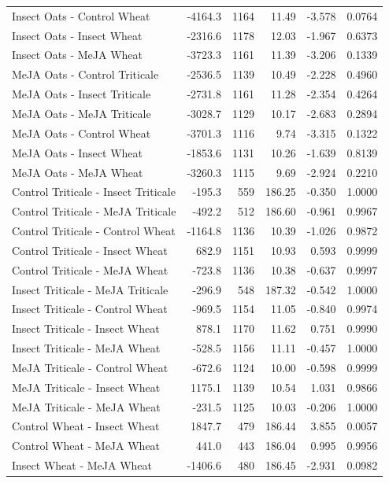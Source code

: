 \documentclass[12pt, letterpaper, ]{report}
\begin{document}
\begin{center}
\begin{longtable}{lrrrrr}
            Insect Oats - Control Wheat &-4164.3 &1164 & 11.49 & -3.578 & 0.0764  \\
            Insect Oats - Insect Wheat &-2316.6 &1178 & 12.03 & -1.967 & 0.6373 \\
            Insect Oats - MeJA Wheat &-3723.3 &1161 & 11.39 & -3.206 & 0.1339 \\
            MeJA Oats - Control Triticale &-2536.5 &1139 & 10.49 & -2.228 & 0.4960 \\
            MeJA Oats - Insect Triticale &-2731.8 &1161 & 11.28 & -2.354 & 0.4264 \\
            MeJA Oats - MeJA Triticale &-3028.7 &1129 & 10.17 & -2.683 & 0.2894 \\
            MeJA Oats - Control Wheat &-3701.3 &1116 & 9.74 & -3.315 & 0.1322 \\
            MeJA Oats - Insect Wheat &-1853.6 &1131 & 10.26 & -1.639 & 0.8139 \\
            MeJA Oats - MeJA Wheat &-3260.3 &1115 & 9.69 & -2.924 & 0.2210 \\
            Control Triticale - Insect Triticale & -195.3 & 559 & 186.25 & -0.350 & 1.0000 \\
            Control Triticale - MeJA Triticale & -492.2 & 512 & 186.60 & -0.961 & 0.9967 \\
            Control Triticale - Control Wheat &-1164.8 &1136 & 10.39 & -1.026 & 0.9872 \\
            Control Triticale - Insect Wheat & 682.9 &1151 & 10.93 & 0.593 & 0.9999 \\
            Control Triticale - MeJA Wheat & -723.8 &1136 & 10.38 & -0.637 & 0.9997 \\
            Insect Triticale - MeJA Triticale & -296.9 & 548 & 187.32 & -0.542 & 1.0000 \\
            Insect Triticale - Control Wheat & -969.5 &1154 & 11.05 & -0.840 & 0.9974 \\
            Insect Triticale - Insect Wheat & 878.1 &1170 & 11.62 & 0.751 & 0.9990 \\
            Insect Triticale - MeJA Wheat & -528.5 &1156 & 11.11 & -0.457 & 1.0000 \\
            MeJA Triticale - Control Wheat & -672.6 &1124 & 10.00 & -0.598 & 0.9999 \\
            MeJA Triticale - Insect Wheat & 1175.1 &1139 & 10.54 & 1.031 & 0.9866 \\
            MeJA Triticale - MeJA Wheat & -231.5 &1125 & 10.03 & -0.206 & 1.0000 \\
            Control Wheat - Insect Wheat & 1847.7 & 479 & 186.44 & 3.855 & 0.0057 \\
            Control Wheat - MeJA Wheat & 441.0 & 443 & 186.04 & 0.995 & 0.9956 \\
            Insect Wheat - MeJA Wheat &-1406.6 & 480 & 186.45 & -2.931 & 0.0982 \\
\end{longtable}
\end{center}
\end{document}
